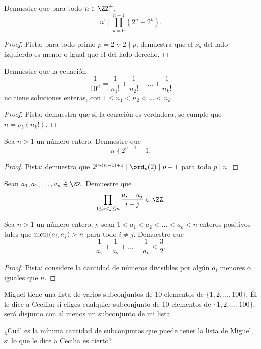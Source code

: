 \begin{probEG}
	Demuestre que para todo $n\in\ZZ^+$,
	\[n!\mid\prod_{k=0}^{n-1}(2^n-2^k).\]
\end{probEG}

\begin{proof}
	Pista: para todo primo $p=2$ y $2\nmid p$, demuestra que el $\nu_p$ del lado izquierdo es menor o igual que el del lado derecho.
\end{proof}

\begin{probEG}
	Demuestre que la ecuación
	\[\frac{1}{10^n}=\frac{1}{n_1!}+\frac{1}{n_2!}+\dots+\frac{1}{n_k!}\]
	no tiene soluciones enteras, con $1\le n_1<n_2<\dots<n_k$.
\end{probEG}

\begin{proof}
	Pista: demuestra que si la ecuación es verdadera, se cumple que $n=\nu_5(n_k!)$.
\end{proof}

\begin{probEG}
	Sea $n>1$ un número entero. Demuestre que
	\[n\nmid 2^{n-1}+1.\]
\end{probEG}

\begin{proof}
	Pista: demuestra que $2^{\nu_2(n-1)+1}\mid\ord_p(2)\mid p-1$ para todo $p\mid n$.
\end{proof}

\begin{probMG}
	Sean $a_1,a_2,\dots,a_n\in\ZZ$. Demuestre que
	\[\prod_{1\le i<j\le n}\frac{a_i-a_j}{i-j}\in\ZZ.\]
\end{probMG}

\begin{probMR}
	Sea $n>1$ un número entero, y sean $1<a_1<a_2<\dots<a_k<n$ enteros positivos tales que $\operatorname{mcm}(a_i,a_j)>n$ para todo $i\ne j$. Demuestre que
	\[\frac{1}{a_1}+\frac{1}{a_2}+\dots+\frac{1}{a_k}<\frac32.\]
\end{probMR}

\begin{proof}
	Pista: considere la cantidad de números divisibles por algún $a_i$ menores o iguales que $n$.
\end{proof}


\begin{probEG}
	Miguel tiene una lista de varios subconjuntos de $10$ elementos de $\{1,2,\dots,100\}$. Él le dice a Cecilia: si eliges cualquier subconjunto de $10$ elementos de $\{1,2,\dots,100\}$, será disjunto con al menos un subconjunto de mi lista.

	¿Cuál es la mínima cantidad de subconjuntos que puede tener la lista de Miguel, si lo que le dice a Cecilia es cierto?
\end{probEG}

